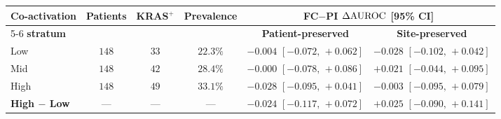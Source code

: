 \footnotesize
\setlength{\tabcolsep}{5pt}
\renewcommand{\arraystretch}{1.15}
\begin{tabular}{l c c c c c}
\toprule
\textbf{Co-activation} & \textbf{Patients} & \textbf{KRAS$^{+}$} &
  \textbf{Prevalence} & \multicolumn{2}{c}{\textbf{FC${-}$PI $\Delta\text{AUROC}$ [95\% CI]}} \\
\cmidrule(lr){5-6}
\textbf{stratum} & & & & \textbf{Patient-preserved} & \textbf{Site-preserved} \\
\midrule
Low    & $148$ & $33$ & $22.3\%$
  & $-0.004$ $[-0.072,\,{+}0.062]$ & $-0.028$ $[-0.102,\,{+}0.042]$ \\
Mid    & $148$ & $42$ & $28.4\%$
  & $-0.000$ $[-0.078,\,{+}0.086]$ & ${+}0.021$ $[-0.044,\,{+}0.095]$ \\
High   & $148$ & $49$ & $33.1\%$
  & $-0.028$ $[-0.095,\,{+}0.041]$ & $-0.003$ $[-0.095,\,{+}0.079]$ \\
\midrule
\textbf{High ${-}$ Low} & --- & --- & ---
  & $\mathbf{-0.024}$ $[-0.117,\,{+}0.072]$
  & $\mathbf{+0.025}$ $[-0.090,\,{+}0.141]$ \\
\bottomrule
\end{tabular}

